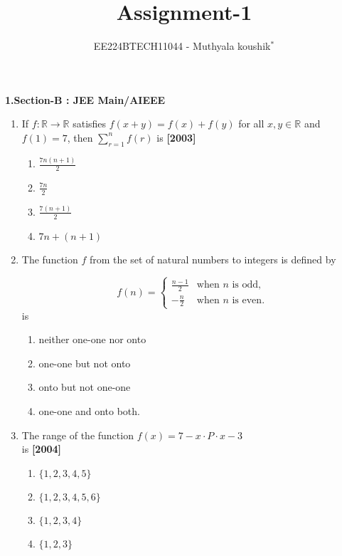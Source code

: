 \documentclass[journal,12pt,twocolumn]{IEEEtran}
\theoremstyle{remark}
\begin{document}

\vspace{3cm}

\title{Assignment-1}
\author{EE224BTECH11044 - Muthyala koushik$^{*}$%
}
\maketitle
\newpage
\bigskip

\renewcommand{\thefigure}{\theenumi}
\renewcommand{\thetable}{\theenumi}

\textbf{1.Section-B : JEE Main/AIEEE}
	

\begin{enumerate}[start=4]
	\item {\small If $f: \mathbb{R} \to \mathbb{R}$ satisfies $f(x+y) = f(x) + f(y)$ for all} $x, y \in \mathbb{R}$ and $f(1) = 7$, then \(\sum_{r=1}^n f(r)\) is \hfill \textbf{[2003]} %

    \begin{enumerate}
        \item \(\frac{7n(n+1)}{2}\)\\
        \item \(\frac{7n}{2}\)\\
        \item \(\frac{7(n+1)}{2}\)\\
        \item \(7n + (n+1)\)
    \end{enumerate}

    \item The function \( f \) from the set of natural numbers to integers is defined by

\[
f(n) = 
\begin{cases} 
\frac{n-1}{2} & \text{when } n \text{ is odd}, \\
-\frac{n}{2} & \text{when } n \text{ is even}.
\end{cases}
\] is

	\begin{enumerate}
		\item neither one-one nor onto
		\item one-one but not onto
		\item onto but not one-one
		\item one-one and onto both.
	\end{enumerate} 

       \item {\small The range of the function} $f(x)= 7-x\cdot P \cdot x-3$ \\ is \hfill \textbf{[2004]}
        \begin{enumerate}
		\item $\{1,2,3,4,5\}$
		\item $\{1,2,3,4,5,6\}$
		\item $\{1,2,3,4\}$
		\item $\{1,2,3\}$
	\end{enumerate}
       

\end{enumerate}
\end{document}
